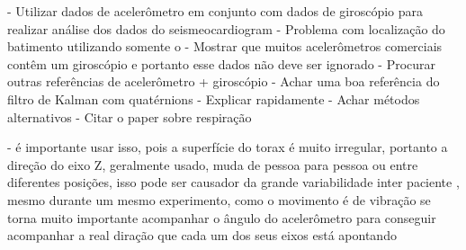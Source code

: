 - Utilizar dados de acelerômetro em conjunto com dados de giroscópio para realizar análise dos dados do seismeocardiogram
    - Problema com localização do batimento utilizando somente o 
    - Mostrar que muitos acelerômetros comerciais contêm um giroscópio e portanto esse dados não deve ser ignorado
    - Procurar outras referências de acelerômetro + giroscópio 
    - Achar uma boa referência do filtro de Kalman com quatérnions
        - Explicar rapidamente
        - Achar métodos alternativos
    - Citar o paper sobre respiração



- é importante usar isso, pois a superfície do torax é muito irregular, portanto  a direção do eixo Z, geralmente usado, muda de pessoa para pessoa ou entre diferentes posições, isso pode ser causador da grande variabilidade inter paciente , mesmo durante um mesmo experimento, como o movimento é de vibração se torna muito importante acompanhar o ângulo do acelerômetro para conseguir acompanhar a real diração que cada um dos seus eixos está apontando
    
    
    
         
